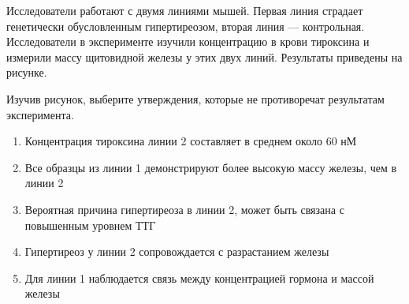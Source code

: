 
Исследователи работают с двумя линиями
мышей.  Первая линия страдает генетически
обусловленным гипертиреозом, вторая линия — контрольная. Исследователи в
эксперименте изучили концентрацию в крови 
тироксина и измерили массу щитовидной железы у этих двух линий.
Результаты приведены на рисунке.


Изучив рисунок, выберите утверждения,
которые не противоречат результатам эксперимента.

\begin{enumerate}
    \item Концентрация тироксина линии 2 составляет в среднем около 60 нМ 
    \item Все образцы из линии 1 демонстрируют более высокую массу железы, чем в линии 2
    \item Вероятная причина гипертиреоза в линии 2, может быть связана с повышенным уровнем ТТГ
    \item Гипертиреоз у линии 2 сопровождается с разрастанием железы
    \item Для линии 1 наблюдается связь между концентрацией гормона и массой железы
\end{enumerate}

\explanationSection

